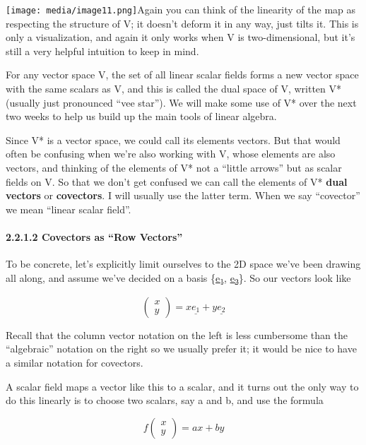 \documentclass[oneside,english]{amsbook}
\numberwithin{section}{chapter}
\theoremstyle{plain}
\theoremstyle{definition}
\begin{document}
\texttt{[image: media/image11.png]}Again
you can think of the linearity of the map as respecting the structure of
V; it doesn't deform it in any way, just tilts it. This is only a
visualization, and again it only works when V is two-dimensional, but
it's still a very helpful intuition to keep in mind.

For any vector space V, the set of all linear scalar fields forms a new
vector space with the same scalars as V, and this is called the dual
space of V, written V* (usually just pronounced ``vee star''). We will
make some use of V* over the next two weeks to help us build up the main
tools of linear algebra.

Since V* is a vector space, we could call its elements vectors. But that
would often be confusing when we're also working with V, whose elements
are also vectors, and thinking of the elements of V* not a ``little
arrows'' but as scalar fields on V. So that we don't get confused we can
call the elements of V* \textbf{dual vectors} or \textbf{covectors}. I
will usually use the latter term. When we say ``covector'' we mean
``linear scalar field''.

\paragraph{2.2.1.2 Covectors as ``Row
	Vectors''}\label{covectors-as-row-vectors}

To be concrete, let's explicitly limit ourselves to the 2D space we've
been drawing all along, and assume we've decided on a basis
\{\ul{e\textsubscript{1}}, \ul{e\textsubscript{2}}\}. So our vectors
look like

\[\begin{pmatrix}
	x \\
	y
\end{pmatrix} = x\underline{e_{1}} + y\underline{e_{2}}\]

Recall that the column vector notation on the left is less cumbersome
than the ``algebraic'' notation on the right so we usually prefer it; it
would be nice to have a similar notation for covectors.

A scalar field maps a vector like this to a scalar, and it turns out the
only way to do this linearly is to choose two scalars, say a and b, and
use the formula

\[f\begin{pmatrix}
	x \\
	y
\end{pmatrix} = ax + by\]
\end{document}
